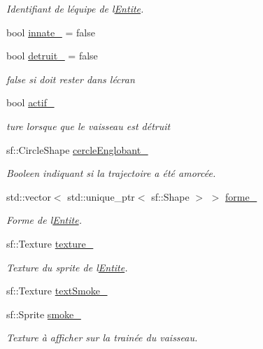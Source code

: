 \begin{DoxyCompactItemize}
\begin{DoxyCompactList}\small\item\em Identifiant de l\textquotesingle{}équipe de l\textquotesingle{}\hyperlink{class_entite}{Entite}. \end{DoxyCompactList}\item 
bool \hyperlink{class_entite_af590dd6815cafa0748f1adc4da1f3cc2}{innate\+\_\+} = false
\item 
bool \hyperlink{class_entite_a2d98d6fac9fb85da156fcda84fcec3ac}{detruit\+\_\+} = false
\begin{DoxyCompactList}\small\item\em false si doit rester dans l\textquotesingle{}écran \end{DoxyCompactList}\item 
bool \hyperlink{class_entite_ac8416aa3acec089b4b0daa818d62fea5}{actif\+\_\+}
\begin{DoxyCompactList}\small\item\em ture lorsque que le vaisseau est détruit \end{DoxyCompactList}\item 
sf\+::\+Circle\+Shape \hyperlink{class_entite_a5b6c62e4dc54221a84ce4dc824fdb2da}{cercle\+Englobant\+\_\+}
\begin{DoxyCompactList}\small\item\em Booleen indiquant si la trajectoire a été amorcée. \end{DoxyCompactList}\item 
std\+::vector$<$ std\+::unique\+\_\+ptr$<$ sf\+::\+Shape $>$ $>$ \hyperlink{class_entite_aa6bbda9a40f701f273c344406a6f5122}{forme\+\_\+}
\begin{DoxyCompactList}\small\item\em Forme de l\textquotesingle{}\hyperlink{class_entite}{Entite}. \end{DoxyCompactList}\item 
sf\+::\+Texture \hyperlink{class_entite_a8147b9459318a9b1de1b72dce115680a}{texture\+\_\+}
\begin{DoxyCompactList}\small\item\em Texture du sprite de l\textquotesingle{}\hyperlink{class_entite}{Entite}. \end{DoxyCompactList}\item 
sf\+::\+Texture \hyperlink{class_entite_ae462844a9f175f3abcf6d91412fb2f21}{text\+Smoke\+\_\+}
\item 
sf\+::\+Sprite \hyperlink{class_entite_a28652fd445f390a0c3f5667ba262b930}{smoke\+\_\+}
\begin{DoxyCompactList}\small\item\em Texture à afficher sur la trainée du vaisseau. \end{DoxyCompactList}\item 

\end{DoxyCompactItemize}
